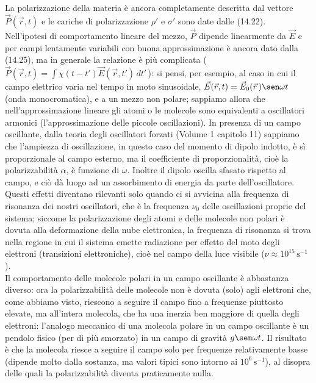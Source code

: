 La polarizzazione della materia \`e ancora completamente descritta dal vettore
$\vec P(\vec r,t)$ e le cariche di polarizzazione $\rho'$ e $\sigma'$ sono date
dalle (14.22).\\
Nell'ipotesi di comportamento lineare del mezzo, $\vec P$ dipende linearmente da
$\vec E$ e per campi lentamente variabili con buona approssimazione \`e ancora
dato dalla (14.25), ma in generale la relazione \`e pi\`u complicata
\big($\vec P(\vec r,t)=\int\chi(t-t')\vec E(\vec r,t')\,dt'$\,\big): si pensi,
per esempio, al caso in cui il campo elettrico varia nel tempo in moto
sinusoidale, $\vec E(\vec r,t)=\vec E_0(\vec r\,)\sen\omega t$ (onda
monocromatica), e a un mezzo non polare; sappiamo allora che
nell'approssimazione lineare gli atomi o le molecole sono equivalenti a
oscillatori armonici (l'approssimazione delle piccole oscillazioni). In presenza
di un campo oscillante, dalla teoria degli oscillatori forzati (Volume 1
capitolo 11) sappiamo che l'ampiezza di oscillazione, in questo caso del momento
di dipolo indotto, \`e s\`i proporzionale al campo esterno, ma il coefficiente
di proporzionalit\`a, cio\`e la polarizzabilit\`a $\alpha$, \`e funzione di
$\omega$. Inoltre il dipolo oscilla sfasato rispetto al campo, e ci\`o d\`a
luogo ad un assorbimento di energia da parte dell'oscillatore.\\
Questi effetti diventano rilevanti solo quando ci si avvicina alla frequenza di
risonanza dei nostri oscillatori, che \`e la frequenza $\nu_0$ delle
oscillazioni proprie del sistema; siccome la polarizzazione degli atomi e delle
molecole non polari \`e dovuta alla deformazione della nube elettronica, la
frequenza di risonanza si trova nella regione in cui il sistema emette
radiazione per effetto del moto degli elettroni (transizioni elettroniche),
cio\`e nel campo della luce visibile ($\nu\approx10^{15}\,\mathrm{s}^{-1}$).\\
Il comportamento delle molecole polari in un campo oscillante \`e abbastanza
diverso: ora la polarizzabilit\`a delle molecole non \`e dovuta (solo) agli
elettroni che, come abbiamo visto, riescono a seguire il campo fino a frequenze
piuttosto elevate, ma all'intera molecola, che ha una inerzia ben maggiore di
quella degli elettroni: l'analogo meccanico di
una molecola polare in un campo oscillante \`e un pendolo fisico (per di pi\`u
smorzato) in un campo di gravit\`a $g\sen\omega t$. Il risultato \`e che la
molecola riesce a seguire il campo solo per frequenze relativamente basse
(dipende molto dalla sostanza, ma valori tipici sono intorno ai
$10^6\,\mathrm{s}^{-1}$), al disopra delle quali la polarizzabilit\`a diventa
praticamente nulla.

